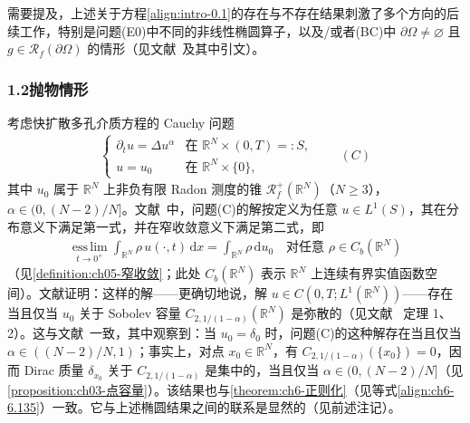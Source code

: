 \documentclass[../main.tex]{subfiles}
\begin{document}
需要提及，上述关于方程\eqref{align:intro-0.1}的存在与不存在结果刺激了多个方向的后续工作，特别是问题(E0)中不同的非线性椭圆算子，以及/或者(BC)中 $\partial\Omega\neq\varnothing$ 且 $g\in\mathscr{R}_f(\partial\Omega)$ 的情形（见文献~\cite{ref14,ref13,ref37,ref55,ref69,ref106}及其中引文）。

\subsubsection*{1.2\quad 抛物情形}\label{subsubsection:intro-parabolic}

考虑快扩散多孔介质方程的 Cauchy 问题
\begin{align*}
\begin{cases}
\partial_t u = \Delta u^\alpha & \text{在 }\mathbb{R}^N\times(0,T)=:S,\\
u=u_0 & \text{在 }\mathbb{R}^N\times\{0\},
\end{cases}
\qquad(C)
\end{align*}
其中 $u_0$ 属于 $\mathbb{R}^N$ 上非负有限 Radon 测度的锥 $\mathscr{R}^+_f(\mathbb{R}^N)$（$N\geqslant 3$），$\alpha\in(0,(N-2)/N]$。文献~\cite{ref80}中，问题(C)的解按定义为任意 $u\in L^1(S)$，其在分布意义下满足第一式，并在窄收敛意义下满足第二式，即
\begin{align*}
\operatorname*{ess\,lim}_{t\to 0^+}\int_{\mathbb{R}^N}\rho\,u(\cdot,t)\,\mathrm{d}x
= \int_{\mathbb{R}^N}\rho\,\mathrm{d}u_0
\quad \text{对任意 }\rho\in C_b(\mathbb{R}^N)
\end{align*}
（见\cref{definition:ch05-窄收敛}；此处 $C_b(\mathbb{R}^N)$ 表示 $\mathbb{R}^N$ 上连续有界实值函数空间）。文献证明：这样的解——更确切地说，解 $u\in C(0,T;L^1(\mathbb{R}^N))$——存在当且仅当 $u_0$ 关于 Sobolev 容量 $C_{2,1/(1-\alpha)}(\mathbb{R}^N)$ 是弥散的（见文献~\cite{ref80} 定理 1、2）。这与文献~\cite{ref26}一致，其中观察到：当 $u_0=\delta_0$ 时，问题(C)的这种解存在当且仅当 $\alpha\in((N-2)/N,1)$；事实上，对点 $x_0\in\mathbb{R}^N$，有 $C_{2,1/(1-\alpha)}(\{x_0\})=0$，因而 Dirac 质量 $\delta_{x_0}$ 关于 $C_{2,1/(1-\alpha)}$ 是集中的，当且仅当 $\alpha\in(0,(N-2)/N]$（见\cref{proposition:ch03-点容量}）。该结果也与\cref{theorem:ch6-正则化}（见等式\eqref{align:ch6-6.135}）一致。它与上述椭圆结果之间的联系是显然的（见前述注记）。
\end{document}
